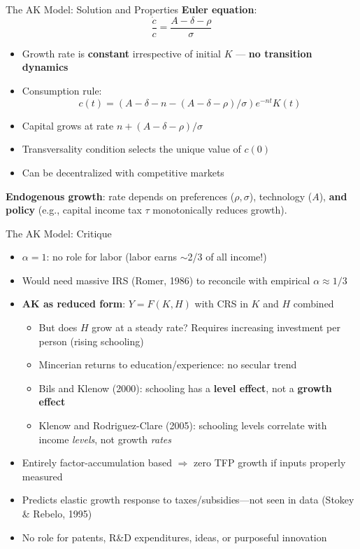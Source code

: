 \documentclass[blue]{beamer}
\begin{document}
	
	\begin{frame}{The AK Model: Solution and Properties}
		\textbf{Euler equation}:
		\[
		\frac{\dot{c}}{c} = \frac{A - \delta - \rho}{\sigma} 
		\]
		
		\begin{itemize}
			\item Growth rate is \textbf{constant} irrespective of initial $K$ --- \textbf{no transition dynamics}
			\item Consumption rule: 
			$$
			c(t) = (A - \delta - n - (A-\delta-\rho)/\sigma)e^{-nt}K(t)
			$$
			\item Capital grows at rate $n + (A-\delta-\rho)/\sigma$
			\item Transversality condition selects the unique value of $c(0)$
			\item Can be decentralized with competitive markets
		\end{itemize}
		
		\bigskip
		\textbf{Endogenous growth}: rate depends on preferences ($\rho, \sigma$), technology ($A$), \textbf{and policy} (e.g., capital income tax $\tau$ monotonically reduces growth).
	\end{frame}
	
	\begin{frame}{The AK Model: Critique}
		\begin{itemize}
			\item $\alpha = 1$: no role for labor (labor earns $\sim$2/3 of all income!)
			\item Would need massive IRS (Romer, 1986) to reconcile with empirical $\alpha \approx 1/3$
			\item \textbf{AK as reduced form}: $Y = F(K, H)$ with CRS in $K$ and $H$ combined
			\begin{itemize}
				\item But does $H$ grow at a steady rate? Requires increasing investment per person (rising schooling)
				\item Mincerian returns to education/experience: no secular trend
				\item Bils and Klenow (2000): schooling has a \textbf{level effect}, not a \textbf{growth effect}
				\item Klenow and Rodriguez-Clare (2005): schooling levels correlate with income \emph{levels}, not growth \emph{rates}
			\end{itemize}
			\item Entirely factor-accumulation based $\Rightarrow$ zero TFP growth if inputs properly measured
			\item Predicts elastic growth response to taxes/subsidies---not seen in data (Stokey \& Rebelo, 1995)
			\item No role for patents, R\&D expenditures, ideas, or purposeful innovation
		\end{itemize}
	\end{frame}
	
\end{document}
